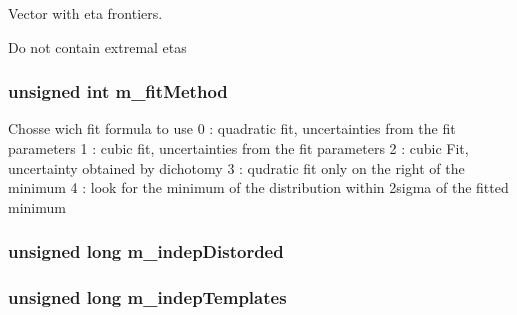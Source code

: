 Vector with eta frontiers. 

Do not contain extremal etas \hypertarget{classTemplateMethod_1_1Setting_ad93b214aa1d5611fe4172efd16fab113}{
\subsubsection[{m\+\_\+fit\+Method}]{\setlength{\rightskip}{0pt plus 5cm}unsigned int m\+\_\+fit\+Method\hspace{0.3cm}{\ttfamily [private]}}}\label{classTemplateMethod_1_1Setting_ad93b214aa1d5611fe4172efd16fab113}
Chosse wich fit formula to use 0 \+: quadratic fit, uncertainties from the fit parameters 1 \+: cubic fit, uncertainties from the fit parameters 2 \+: cubic Fit, uncertainty obtained by dichotomy 3 \+: qudratic fit only on the right of the minimum 4 \+: look for the minimum of the distribution within 2sigma of the fitted minimum \hypertarget{classTemplateMethod_1_1Setting_a8f4073fd2568a9eedf045fb4c06cda8e}{
\subsubsection[{m\+\_\+indep\+Distorded}]{\setlength{\rightskip}{0pt plus 5cm}unsigned long m\+\_\+indep\+Distorded\hspace{0.3cm}{\ttfamily [private]}}}\label{classTemplateMethod_1_1Setting_a8f4073fd2568a9eedf045fb4c06cda8e}
\hypertarget{classTemplateMethod_1_1Setting_afaeffdb355dfea78cda3000b236390b2}{
\subsubsection[{m\+\_\+indep\+Templates}]{\setlength{\rightskip}{0pt plus 5cm}unsigned long m\+\_\+indep\+Templates\hspace{0.3cm}{\ttfamily [private]}}}\label{classTemplateMethod_1_1Setting_afaeffdb355dfea78cda3000b236390b2}
